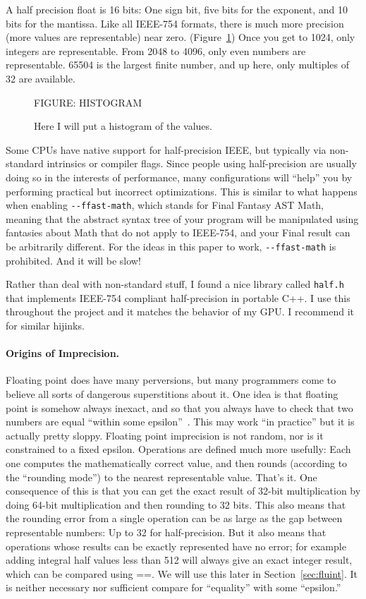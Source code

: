 \documentclass[twocolumn]{article}
\begin{document}
A half precision float is 16 bits: One sign bit, five bits for the
exponent, and 10 bits for the mantissa. Like all IEEE-754 formats,
there is much more precision (more values are representable) near
zero. (Figure~\ref{fig:histogram}) Once you get to 1024,
only integers are representable. From 2048 to 4096, only even numbers
are representable. 65504 is the largest finite number, and up here,
only multiples of 32 are available.

\begin{figure}
FIGURE: HISTOGRAM
\caption{
Here I will put a histogram of the values.
  } \label{fig:histogram}
\end{figure}

Some CPUs have native support for half-precision IEEE, but typically
via non-standard intrinsics or compiler flags. Since people using
half-precision are usually doing so in the interests of performance,
many configurations will ``help'' you by performing practical but
incorrect optimizations. This is similar to what happens when enabling
\verb|--ffast-math|, which stands for Final Fantasy AST Math, meaning
that the abstract syntax tree of your program will be manipulated
using fantasies about Math that do not apply to IEEE-754, and your
Final result can be arbitrarily different. For the ideas in this paper
to work, \verb|--ffast-math| is prohibited. And it will be slow!

Rather than deal with non-standard stuff, I found a nice library
called {\tt half.h}~\cite{half} that implements IEEE-754 compliant
half-precision in portable C++. I use this throughout the project
and it matches the behavior of my GPU. I recommend it for similar
hijinks.

\paragraph{Origins of Imprecision.}
Floating point does have many perversions, but many programmers come
to believe all sorts of dangerous superstitions about it. One idea is
that floating point is somehow always inexact, and so that you always
have to check that two numbers are equal ``within some
epsilon''~\cite{murphy2014epsilon}. This may work ``in practice'' but
it is actually pretty sloppy. Floating point imprecision is not
random, nor is it constrained to a fixed epsilon. Operations are
defined much more usefully: Each one computes the mathematically
correct value, and then rounds (according to the ``rounding mode'') to
the nearest representable value. That's it. One consequence of this is
that you can get the exact result of 32-bit multiplication by doing
64-bit multiplication and then rounding to 32 bits. This also means
that the rounding error from a single operation can be as large as the
gap between representable numbers: Up to 32 for half-precision. But it
also means that operations whose results can be exactly represented
have no error; for example adding integral half values less than 512
will always give an exact integer result, which can be compared using
==. We will use this later in Section~\ref{sec:fluint}. It is
neither necessary nor sufficient compare for ``equality'' with some
``epsilon.''
\end{document}

